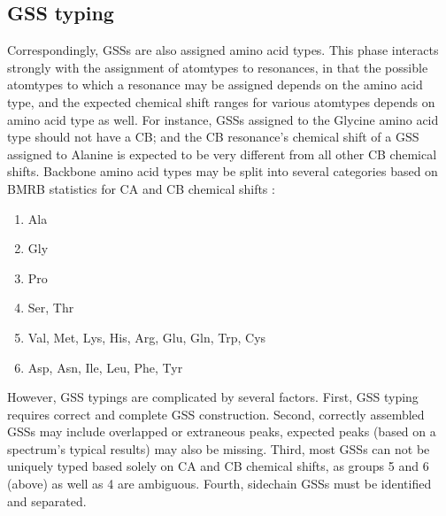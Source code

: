 \subsection{GSS typing}
Correspondingly, GSSs are also assigned amino acid types.  This phase 
interacts strongly with the assignment of atomtypes to resonances, in 
that the possible atomtypes to which a resonance may be assigned depends 
on the amino acid type, and the expected chemical shift ranges for various 
atomtypes depends on amino acid type as well.  For instance, GSSs assigned 
to the Glycine amino acid type should not have a CB; and the CB resonance's 
chemical shift of a GSS assigned to Alanine is expected to be very different 
from all other CB chemical shifts.  Backbone amino acid types may be split 
into several categories \cite{saga} based on BMRB statistics for 
CA and CB chemical shifts \cite{bmrb}:
\begin{enumerate}
  \item Ala
  \item Gly 
  \item Pro
  \item Ser, Thr
  \item Val, Met, Lys, His, Arg, Glu, Gln, Trp, Cys
  \item Asp, Asn, Ile, Leu, Phe, Tyr
\end{enumerate}
However, GSS typings are complicated by several factors.  First, GSS typing 
requires correct and complete GSS construction.  Second, correctly assembled 
GSSs may include overlapped or extraneous peaks, expected peaks (based on a 
spectrum's typical results) may also be missing.  Third, most GSSs can not 
be uniquely typed based solely on CA and CB chemical shifts, as groups 5 and 
6 (above) as well as 4 are ambiguous.  Fourth, sidechain GSSs must be 
identified and separated.


